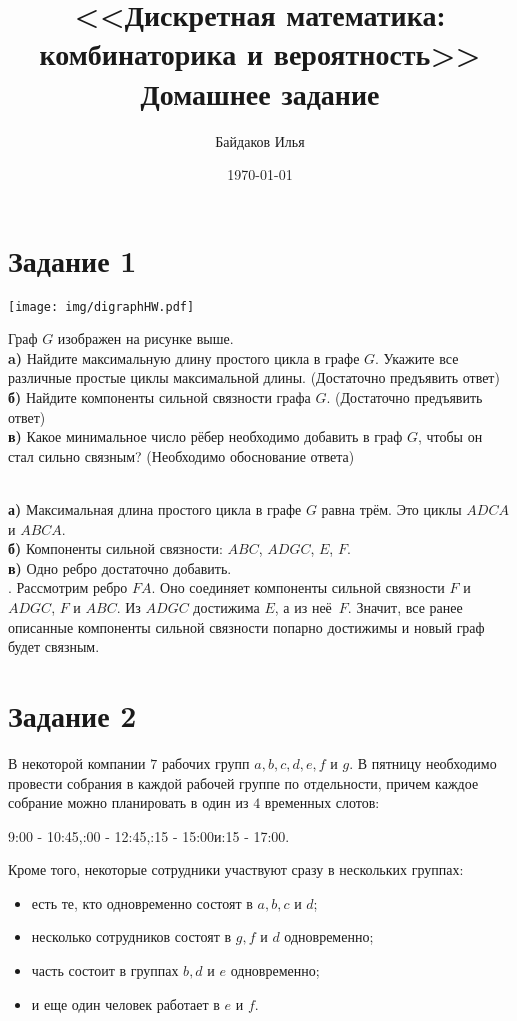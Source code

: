 \documentclass[a4paper,12pt]{article}
\begin{document}
\title{<<Дискретная математика: \\ комбинаторика и вероятность>> \\ \vspace{12pt} Домашнее задание}
\author{Байдаков Илья}
\date{\today}
\maketitle


\section*{Задание 1}
\centerline{\texttt{[image: img/digraphHW.pdf]}}
Граф $G$ изображен на рисунке выше.\\
{\bf a)} Найдите максимальную длину простого цикла в графе $G$. Укажите
все различные простые циклы максимальной длины. (Достаточно предъявить ответ)\\
{\bf б)} Найдите компоненты сильной связности графа $G$. (Достаточно предъявить ответ)\\
{\bf в)} Какое минимальное число рёбер необходимо добавить в граф $G$, чтобы
он стал сильно связным? (Необходимо обоснование ответа)\par
\newpage
{} \\
{\bf а)} Максимальная длина простого цикла в графе $G$ равна трём. Это циклы $ADCA$ и $ABCA$.\\
{\bf б)} Компоненты сильной связности: $ABC$, $ADGC$, $E$, $F$.\\
{\bf в)} Одно ребро достаточно добавить. \\
{.} Рассмотрим ребро $FA$. Оно соединяет компоненты сильной связности $F$ и $ADGC$, $F$ и $ABC$. Из $ADGC$ достижима $E$, а из неё~$F$. Значит, все ранее описанные компоненты сильной связности попарно достижимы и новый граф будет связным.

\section*{Задание 2}
В некоторой компании $7$ рабочих групп $a,b,c,d,e,f$ и $g$. В пятницу необходимо провести собрания в каждой рабочей группе по отдельности, причем каждое собрание можно планировать в один из $4$ временных слотов: \\
\centerline{9:00 - 10:45,:00 - 12:45,:15 - 15:00\quad и:15 - 17:00.}

\noindent Кроме того, некоторые сотрудники участвуют сразу в нескольких группах:
\begin{itemize}
\item есть те, кто одновременно состоят в $a,b,c$ и $d$;

\item несколько сотрудников состоят в $g,f$ и $d$ одновременно;

\item часть состоит в группах $b,d$ и $e$ одновременно;

\item и еще один человек работает в $e$ и $f$.
\end{itemize}
\end{document}
